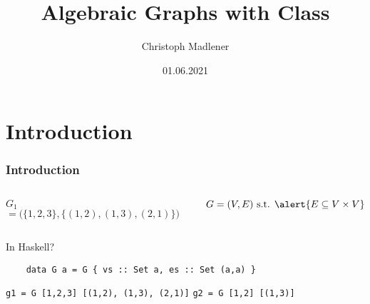 \documentclass{beamer}
\title{Algebraic Graphs with Class}
\author{Christoph Madlener}
\date{01.06.2021}
\newcommand{\hs}{\texttt}
\begin{document}
\begin{frame}[plain]
  \titlepage
\end{frame}

\section{Introduction}
\begin{frame}[fragile]
  \frametitle{Introduction}

  \begin{columns}
    \begin{column}{.6\linewidth}
      \centering
      $G_1$${} = \Big(\big\{1,2,3\big\}, \big\{(1,2), (1,3), (2,1)\big\}\Big)$
    \end{column}
    \begin{column}{.35\linewidth}
      \[
        G = (V,E) \text{ s.t. } \alert{E \subseteq V \times V}
      \]
    \end{column}
  \end{columns}

  \begin{alertblock}{In Haskell?}
    \begin{verbatim}
    data G a = G { vs :: Set a, es :: Set (a,a) }
    \end{verbatim}
    \hs{g1 = G [1,2,3] [(1,2), (1,3), (2,1)]} 
    \hs{g2 = G [1,2] [(1,3)]} 
  \end{alertblock}
\end{frame}
\end{document}
